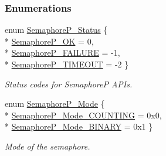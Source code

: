 \subsubsection*{Enumerations}
\begin{DoxyCompactItemize}
\item 
enum \hyperlink{_semaphore_p_8h_a5d4aebe0ebff4aaadba07d853ae4ee42}{Semaphore\+P\+\_\+\+Status} \{ \\*
\hyperlink{_semaphore_p_8h_a5d4aebe0ebff4aaadba07d853ae4ee42ac0da41b8e53bce919bbbec5aef644d42}{Semaphore\+P\+\_\+\+O\+K} = 0, 
\\*
\hyperlink{_semaphore_p_8h_a5d4aebe0ebff4aaadba07d853ae4ee42a21f9c91a89021706d666e97d50abf038}{Semaphore\+P\+\_\+\+F\+A\+I\+L\+U\+R\+E} = -\/1, 
\\*
\hyperlink{_semaphore_p_8h_a5d4aebe0ebff4aaadba07d853ae4ee42aaae2b0c8389e227faa6d8198879bd7ab}{Semaphore\+P\+\_\+\+T\+I\+M\+E\+O\+U\+T} = -\/2
 \}
\begin{DoxyCompactList}\small\item\em Status codes for Semaphore\+P A\+P\+Is. \end{DoxyCompactList}\item 
enum \hyperlink{_semaphore_p_8h_add3b3b8c066d33d0067fac18e839f8ff}{Semaphore\+P\+\_\+\+Mode} \{ \\*
\hyperlink{_semaphore_p_8h_add3b3b8c066d33d0067fac18e839f8ffabcde1f1674c15cf87e3d8b8e8de53091}{Semaphore\+P\+\_\+\+Mode\+\_\+\+C\+O\+U\+N\+T\+I\+N\+G} = 0x0, 
\\*
\hyperlink{_semaphore_p_8h_add3b3b8c066d33d0067fac18e839f8ffacf53dfcfc30e664856ba170da10bde91}{Semaphore\+P\+\_\+\+Mode\+\_\+\+B\+I\+N\+A\+R\+Y} = 0x1
 \}
\begin{DoxyCompactList}\small\item\em Mode of the semaphore. \end{DoxyCompactList}\end{DoxyCompactItemize}
